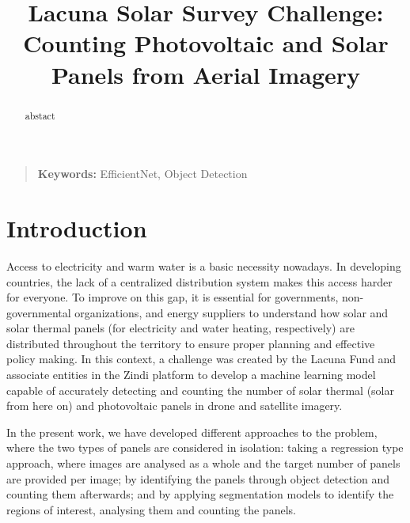 \documentclass[conference]{IEEEtran}
\begin{document}
\title{Lacuna Solar Survey Challenge: Counting Photovoltaic and Solar Panels from Aerial Imagery}

\author{
\and
{}
}

\maketitle
\thispagestyle{plain}

\begin{abstract}
abstact
\end{abstract}

\begin{quote}
\small
\noindent
\textbf{Keywords:} EfficientNet, Object Detection
\end{quote}

\IEEEpeerreviewmaketitle


\section{Introduction}

Access to electricity and warm water is a basic necessity nowadays. In developing countries, the lack of a centralized distribution system makes this access harder for everyone. To improve on this gap, it is essential for governments, non-governmental organizations, and energy suppliers to understand how solar and solar thermal panels (for electricity and water heating, respectively) are distributed throughout the territory to ensure proper planning and effective policy making. In this context, a challenge was created by the Lacuna Fund and associate entities in the Zindi platform to develop a machine learning model capable of accurately detecting and counting the number of solar thermal (solar from here on) and photovoltaic panels in drone and satellite imagery.

In the present work, we have developed different approaches to the problem, where the two types of panels are considered in isolation: taking a regression type approach, where images are analysed as a whole and the target number of panels are provided per image; by identifying the panels through object detection and counting them afterwards; and by applying segmentation models to identify the regions of interest, analysing them and counting the panels.
\end{document}
